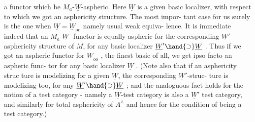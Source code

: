 
a functor which be $M_a$-$\underline{W}$-aspheric.  Here $\underline{W}$  is a given basic localizer,
with respect to which we got an asphericity structure.  The most impor-%
tant case for us surely is the one when $\underline{W}=\underline{W}_{\mathrm{oo}}$ namely usual weak equiva-%
lence.  It is immediate indeed that an $M_a$-$\underline{W}$- functor is equally 
aspheric for the corresponding $\underline{W}'$-asphericity structure of $M$,  for any
basic localizer $\underline{W}'\hand{\supset}\underline{W}$ .  Thus if we got an aspheric functor for $\underline{W}_{\mathrm{oo}}$ ,
the finest basic  of all,  we get ipso facto an aspheric func-%
tor for any basic localizer $\underline{W}$ .  (Note also that if an asphericity struc
ture is modelizing for a given $\underline{W}$,   the corresponding $\underline{W}'$-struc-%
ture is modelizing too,  for any $\underline{W}'\hand{\supset}\underline{W}$ ;  and the analoguous fact holds
for the notion of a test category  -  namely a $\underline{W}$-test category is also
a $\underline{W}'$ test category, and similarly for  total asphericity of $A^\wedge$ and
hence for the condition of being a \hand{\uline{\textcolor{black}{strict}}} test category.)

